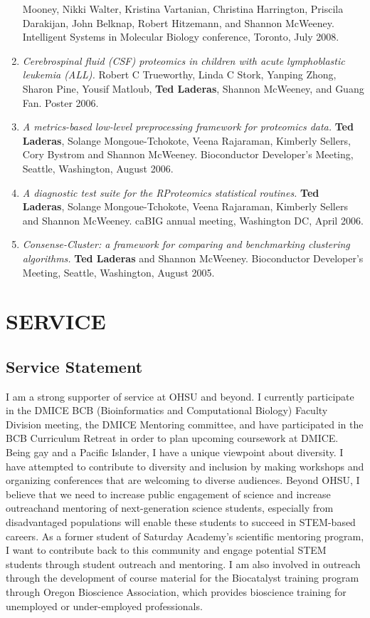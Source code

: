 \documentclass[11pt,]{article}
\begin{document}
\begin{enumerate}
  Mooney, Nikki Walter, Kristina Vartanian, Christina Harrington,
  Priscila Darakijan, John Belknap, Robert Hitzemann, and Shannon
  McWeeney. Intelligent Systems in Molecular Biology conference,
  Toronto, July 2008.
\item
  \emph{Cerebrospinal fluid (CSF) proteomics in children with acute
  lymphoblastic leukemia (ALL).} Robert C Trueworthy, Linda C Stork,
  Yanping Zhong, Sharon Pine, Yousif Matloub, \textbf{Ted Laderas},
  Shannon McWeeney, and Guang Fan. Poster 2006.
\item
  \emph{A metrics-based low-level preprocessing framework for proteomics
  data.} \textbf{Ted Laderas}, Solange Mongoue-Tchokote, Veena
  Rajaraman, Kimberly Sellers, Cory Bystrom and Shannon McWeeney.
  Bioconductor Developer's Meeting, Seattle, Washington, August 2006.
\item
  \emph{A diagnostic test suite for the RProteomics statistical
  routines.} \textbf{Ted Laderas}, Solange Mongoue-Tchokote, Veena
  Rajaraman, Kimberly Sellers and Shannon McWeeney. caBIG annual
  meeting, Washington DC, April 2006.
\item
  \emph{Consense-Cluster: a framework for comparing and benchmarking
  clustering algorithms.} \textbf{Ted Laderas} and Shannon McWeeney.
  Bioconductor Developer's Meeting, Seattle, Washington, August 2005.
\end{enumerate}

\section{SERVICE}\label{service}

\subsection{Service Statement}\label{service-statement}

I am a strong supporter of service at OHSU and beyond. I currently
participate in the DMICE BCB (Bioinformatics and Computational Biology)
Faculty Division meeting, the DMICE Mentoring committee, and have
participated in the BCB Curriculum Retreat in order to plan upcoming
coursework at DMICE. Being gay and a Pacific Islander, I have a unique
viewpoint about diversity. I have attempted to contribute to diversity
and inclusion by making workshops and organizing conferences that are
welcoming to diverse audiences. Beyond OHSU, I believe that we need to
increase public engagement of science and increase outreachand mentoring
of next-generation science students, especially from disadvantaged
populations will enable these students to succeed in STEM-based careers.
As a former student of Saturday Academy's scientific mentoring program,
I want to contribute back to this community and engage potential STEM
students through student outreach and mentoring. I am also involved in
outreach through the development of course material for the Biocatalyst
training program through Oregon Bioscience Association, which provides
bioscience training for unemployed or under-employed professionals.
\end{document}
